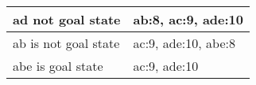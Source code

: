 \documentclass{article}
\begin{document}
\begin{enumerate}
{\begin{table}[H]
\begin{tabular}{|l|l|}
                                        \hline
                                        ad not goal state & ab:8, ac:9, ade:10\\
                                        \hline
                                        ab is not goal state & ac:9, ade:10, abe:8\\
                                        \hline
                                        abe is goal state & ac:9, ade:10\\
                                        \hline
                                \end{tabular}
                                \caption{}\label{a*}
                        \end{table}
                }
\end{enumerate}
\end{document}
